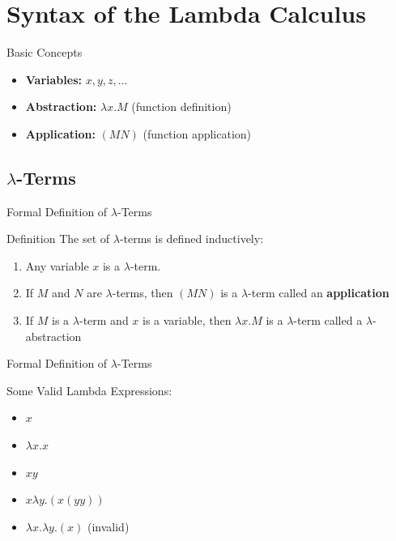 \documentclass{beamer}
\begin{document}
\section{Syntax of the Lambda Calculus}
\begin{frame}{Basic Concepts}
  \begin{itemize}
    \item \textbf{Variables:} $x, y, z, \dots$
    \item \textbf{Abstraction:} $\lambda x.M$ (function definition)
    \item \textbf{Application:} $(MN)$ (function application)
  \end{itemize}
\end{frame}

\subsection{$\lambda$-Terms}
\begin{frame}{Formal Definition of $\lambda$-Terms}
  \begin{block}{Definition}
    The set of $\lambda$-terms is defined inductively:
    \begin{enumerate}
      \item Any variable $x$ is a $\lambda$-term.
      \item If $M$ and $N$ are $\lambda$-terms, then $(M N)$ is a $\lambda$-term called an \textbf{application}
      \item If $M$ is a $\lambda$-term and $x$ is a variable, then $\lambda x.M$ is a $\lambda$-term called a $\lambda$-abstraction
    \end{enumerate}
  \end{block}
\end{frame}

\begin{frame}{Formal Definition of $\lambda$-Terms}
  \begin{block}{Some Valid Lambda Expressions:}
  \begin{itemize}
      \item $x$
      \item $\lambda x.x$
      \item $xy$
      \item $x\lambda y.(x(yy))$
      \item $\lambda x.\lambda y.(x)$ (invalid)
  \end{itemize}
  \end{block}
\end{frame}
\end{document}
